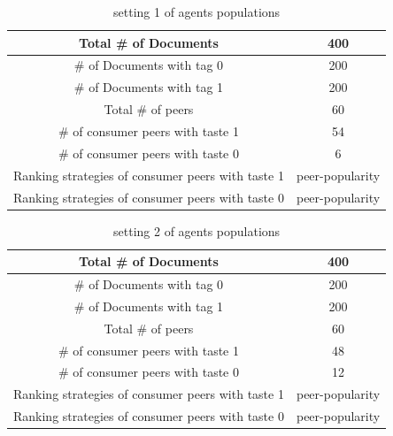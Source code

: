\documentclass [12pt]{article} \usepackage{multicol}
\begin{document}
\begin{table}[h!]
\caption{setting 1 of agents populations}
\begin{center}


\begin{tabular}{|c|c|}
\hline

Total \# of Documents &  400  \\ \hline
\# of Documents with tag 0 &  200  \\ \hline
\# of Documents with tag 1 &  200  \\ \hline

Total \# of peers & 60 \\ \hline

\# of consumer peers with taste 1  & 54 \\ \hline 
\# of consumer peers with taste 0  &  6\\ \hline

Ranking strategies of consumer peers with taste 1  & peer-popularity \\ \hline 
Ranking strategies of consumer peers with taste 0  &  peer-popularity\\ \hline


\end{tabular}

\end{center}
\label{default}
\end{table}



\begin{table}[h!]
\caption{setting 2 of agents populations}
\begin{center}


\begin{tabular}{|c|c|}
\hline

Total \# of Documents &  400  \\ \hline
\# of Documents with tag 0 &  200  \\ \hline
\# of Documents with tag 1 &  200  \\ \hline

Total \# of peers & 60 \\ \hline
\# of consumer peers with taste 1  &  48 \\ \hline 
\# of consumer peers with taste 0  &  12 \\ \hline

Ranking strategies of consumer peers with taste 1  & peer-popularity \\ \hline 
Ranking strategies of consumer peers with taste 0  &  peer-popularity\\ \hline

\end{tabular}

\end{center}
\label{default}
\end{table}
\end{document}
